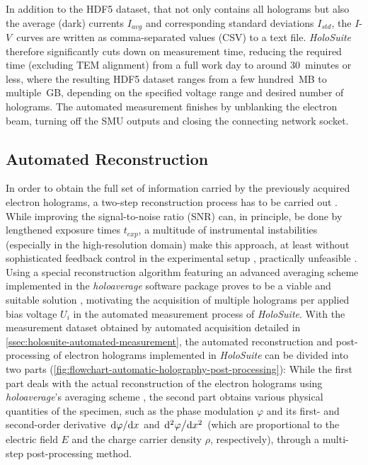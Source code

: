 In addition to the HDF5 dataset, that not only contains all holograms but also the average (dark) currents $I_{\mathit{avg}}$ and corresponding standard deviations $I_{\mathit{std}}$, the $I$-$V$~curves are written as comma-separated values (CSV) to a text file. \emph{HoloSuite} therefore significantly cuts down on measurement time, reducing the required time (excluding TEM alignment) from a full work day to around 30~minutes or less, where the resulting HDF5 dataset ranges from a few hundred~MB to multiple~GB, depending on the specified voltage range and desired number of holograms. The automated measurement finishes by unblanking the electron beam, turning off the SMU outputs and closing the connecting network socket.
\subsection{Automated Reconstruction} \label{ssec:holosuite-automated-reconstruction}
In order to obtain the full set of information carried by the previously acquired electron
holograms, a two-step reconstruction process has to be carried out \cite{Voelkl1999,Lehmann2002,Lichte2008}. While improving the signal-to-noise ratio (SNR) can, in principle, be done by lengthened exposure times $t_{\mathit{exp}}$, a multitude of instrumental instabilities (especially in the high-resolution domain) make this approach, at least without sophisticated feedback control in the experimental setup \cite{Gatel2018,Takahashi2020}, practically unfeasible \cite{Niermann2014}. Using a special reconstruction algorithm featuring an advanced averaging scheme implemented in the \emph{holoaverage} software package proves to be a viable and suitable solution \cite{Niermann2014}, motivating the acquisition of multiple holograms per applied bias voltage $U_i$ in the automated measurement process of \emph{HoloSuite}.
\newpage
With the measurement dataset obtained by automated acquisition detailed in \cref{ssec:holosuite-automated-measurement}, the automated reconstruction and post-processing of electron holograms implemented in \emph{HoloSuite} can be divided into two parts (\cref{fig:flowchart-automatic-holography-post-processing}): While the first part deals with the actual reconstruction of the electron holograms using \emph{holoaverage}'s averaging scheme \cite{Niermann2014}, the second part obtains various physical quantities of the specimen, such as the phase modulation $\varphi$ and its first- and second-order derivative $\dv*{\varphi}{x}$ and $\dv*[2]{\varphi}{x}$ (which are proportional to the electric field $E$ and the charge carrier density $\rho$, respectively), through a multi-step post-processing method.
